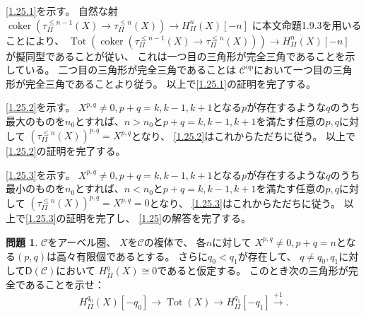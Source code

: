 \documentclass[uplatex,dvipdfmx]{jsarticle}
\makeatletter
\theoremstyle{definition}
\newtheorem{prob}[prob]{問題}
\renewenvironment{proof}[1][\proofname]{
  \pushQED{\qed}%
  \normalfont \topsep6\p@\@plus6\p@\relax
  \trivlist
  \item[\hskip\labelsep
    #1\@addpunct{\textbf{.}}]\ignorespaces
}{%
  \popQED\endtrivlist\@endpefalse
}
\providecommand{\proofname}{証明}
\newcommand{\op}{\mathrm{op}}
\DeclareMathOperator{\Tot}{\mathrm{Tot}}
\DeclareMathOperator{\coker}{\mathrm{coker}}
\newcommand{\sfD}{\mathsf{D}}
\newcommand\mcC{\mathcal{C}}
\makeatother
\begin{document}
\begin{proof}
  \ref{1.25.1}を示す。
  自然な射
  \(\coker(\tau_{II}^{\leq n-1}(X) \to \tau_{II}^{\leq n}(X))\to H_{II}^n(X)[-n]\)
  に本文命題1.9.3を用いることにより、
  \(\Tot(\coker(\tau_{II}^{\leq n-1}(X) \to \tau_{II}^{\leq n}(X)))\to H_{II}^n(X)[-n]\)
  が擬同型であることが従い、
  これは一つ目の三角形が完全三角であることを示している。
  二つ目の三角形が完全三角であることは
  \(\mcC^{\op}\)において一つ目の三角形が完全三角であることより従う。
  以上で\ref{1.25.1}の証明を完了する。

  \ref{1.25.2}を示す。
  \(X^{p,q}\neq 0, p+q=k,k-1,k+1\)となる\(p\)が存在するような\(q\)のうち
  最大のものを\(n_0\)とすれば、\(n > n_0\)と\(p+q=k,k-1,k+1\)を満たす任意の\(p,q\)に対して
  \((\tau_{II}^{\leq n}(X))^{p,q} = X^{p,q}\)となり、
  \ref{1.25.2}はこれからただちに従う。
  以上で\ref{1.25.2}の証明を完了する。

  \ref{1.25.3}を示す。
  \(X^{p,q}\neq 0, p+q=k,k-1,k+1\)となる\(p\)が存在するような\(q\)のうち
  最小のものを\(n_0\)とすれば、\(n < n_0\)と\(p+q=k,k-1,k+1\)を満たす任意の\(p,q\)に対して
  \((\tau_{II}^{\leq n}(X))^{p,q} = X^{p,q} = 0\)となり、
  \ref{1.25.3}はこれからただちに従う。
  以上で\ref{1.25.3}の証明を完了し、
  \autoref{1.25}の解答を完了する。
\end{proof}







\begin{prob}\label{1.26}
  \(\mcC\)をアーベル圏、
  \(X\)を\(\mcC\)の複体で、
  各\(n\)に対して
  \(X^{p,q}\neq 0, p+q=n\)となる\((p,q)\)は高々有限個であるとする。
  さらに\(q_0 < q_1\)が存在して、
  \(q\neq q_0,q_1\)に対して\(\sfD(\mcC)\)において
  \(H_{II}^q(X) \cong 0\)であると仮定する。
  このとき次の三角形が完全であることを示せ：
  \[
  H_{II}^{q_0}(X)[-q_0] \to \Tot(X) \to H_{II}^{q_1}[-q_1]
  \xrightarrow{+1}.
  \]
\end{prob}
\end{document}

